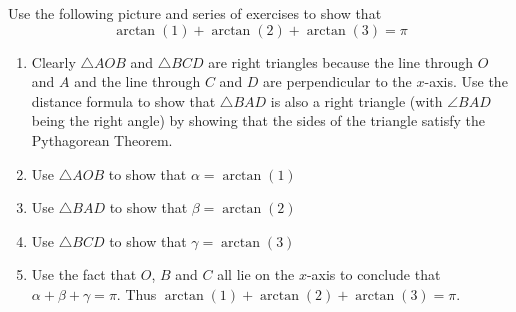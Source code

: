 {Use the following picture and series of exercises to show that 
\[\arctan(1) + \arctan(2) + \arctan(3) = \pi\]

\begin{center}
\end{center}

\begin{enumerate}
 \item Clearly $\triangle AOB$ and $\triangle BCD$ are right triangles because the line through $O$ and $A$ and the line through $C$ and $D$ are perpendicular to the $x$-axis. Use the distance formula to show that $\triangle BAD$ is also a right triangle (with $\angle BAD$ being the right angle) by showing that the sides of the triangle satisfy the Pythagorean Theorem. 
 \item Use $\triangle AOB$ to show that $\alpha = \arctan(1)$ 
 \item Use $\triangle BAD$ to show that $\beta = \arctan(2)$ 
 \item Use $\triangle BCD$ to show that $\gamma = \arctan(3)$ \item Use the fact that $O$, $B$ and $C$ all lie on the $x$-axis to conclude that $\alpha + \beta + \gamma = \pi$. Thus $\arctan(1) + \arctan(2) + \arctan(3) = \pi$.
 \end{enumerate}}
 {}